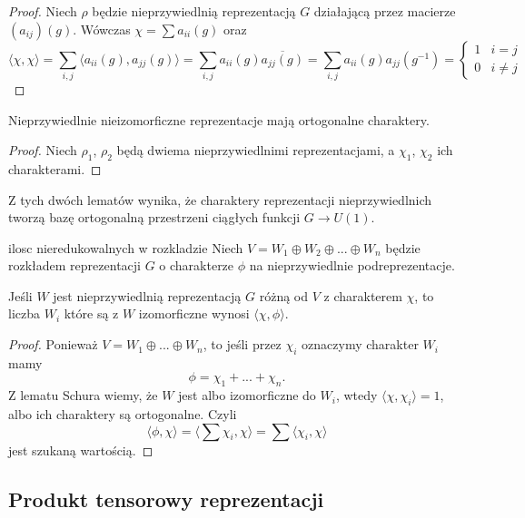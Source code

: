 \begin{proof}
  Niech $\rho$ będzie nieprzywiedlnią reprezentacją $G$ działającą przez macierze $(a_{ij})(g)$. Wówczas $\chi=\sum a_{ii}(g)$ oraz
  $$\langle \chi, \chi\rangle=\sum_{i,j} \langle a_{ii}(g),a_{jj}(g)\rangle=\sum_{i,j}a_{ii}(g)\overline{a_{jj}(g)}=\sum_{i,j}a_{ii}(g)a_{jj}(g^{-1})=\begin{cases}1 & i=j\\ 0 & i\neq j\end{cases}$$
\end{proof}

\begin{lemma}{}{}\color{red}
  Nieprzywiedlnie nieizomorficzne reprezentacje mają ortogonalne charaktery.
\end{lemma}

\begin{proof}
  Niech $\rho_1$, $\rho_2$ będą dwiema nieprzywiedlnimi reprezentacjami, a $\chi_1$, $\chi_2$ ich charakterami. 
\end{proof}

Z tych dwóch lematów wynika, że charaktery reprezentacji nieprzywiedlnich tworzą bazę ortogonalną przestrzeni ciągłych funkcji $G\to U(1)$.

\begin{theorem}{}{ilosc nieredukowalnych w rozkladzie}
  Niech $V=W_1\oplus W_2\oplus ... \oplus W_n$ będzie rozkładem reprezentacji $G$ o charakterze $\phi$ na nieprzywiedlnie podreprezentacje. 

  Jeśli $W$ jest nieprzywiedlnią reprezentacją $G$ różną od $V$ z charakterem $\chi$, to liczba $W_i$ które są z $W$ izomorficzne wynosi $\langle \chi, \phi\rangle$.
\end{theorem}

\begin{proof}
  Ponieważ $V=W_1\oplus...\oplus W_n$, to jeśli przez $\chi_i$ oznaczymy charakter $W_i$ mamy
  $$\phi=\chi_1+...+\chi_n.$$
  Z lematu Schura wiemy, że $W$ jest albo izomorficzne do $W_i$, wtedy $\langle \chi, \chi_i\rangle=1$, albo ich charaktery są ortogonalne. Czyli
  $$\langle \phi, \chi\rangle=\langle \sum \chi_i, \chi\rangle =\sum \langle \chi_i, \chi\rangle$$
  jest szukaną wartością.
\end{proof}

\subsection{Produkt tensorowy reprezentacji}

